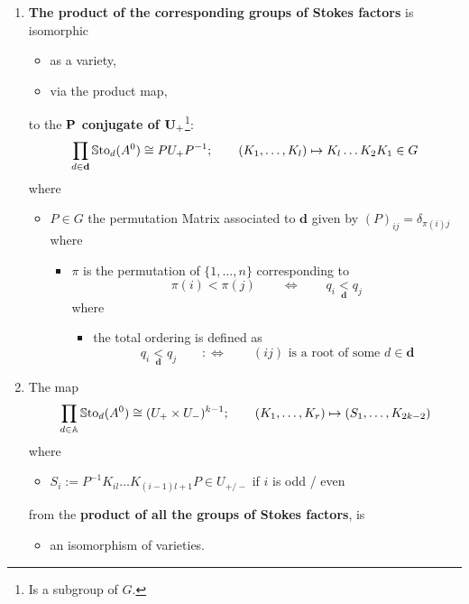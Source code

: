 \begin{lem}[3.2]
  \begin{enumerate}
    \item \textbf{The product of the corresponding groups of Stokes factors} is
      isomorphic
      \begin{itemize}
        \item as a variety,
        \item via the product map,
      \end{itemize}
      to the \textbf{$\bf P$ conjugate of $\bf U_+$}\footnote{Is a subgroup of
      $G$.}:
      \[
        \prod_{d\in\textbf{d}}\operatorname{\mathbb{S}to}_d(A^0)\cong PU_+P^{-1} ;
        \qquad
        (K_1,\dots,K_l)\mapsto K_l\dots K_2K_1\in G
      \]
      where
      \begin{itemize}
        \item $P\in G$ the permutation Matrix associated to $\textbf{d}$ given
          by $(P)_{ij}=\delta_{\pi(i)j}$ where
          \begin{itemize}
            \item $\pi$ is the permutation of $\{1,\dots,n\}$ corresponding to
            \[
              \pi(i)<\pi(j)
              \qquad \Leftrightarrow \qquad
              q_i\underset{\textbf{d}}{<}q_j
            \]
            where
            \begin{itemize}
              \item the total ordering is defined as
                \[
                  q_i\underset{\textbf{d}}{<}q_j \qquad :\Leftrightarrow
                    \qquad (ij) \text{ is a root of some } d\in\textbf{d}
                \]
            \end{itemize}
          \end{itemize}
      \end{itemize}
    \item The map
      \[
        \prod_{d\in\mathbb{A}}\operatorname{\mathbb{S}to}_d(A^0)\cong (U_+\times U_-)^{k-1} ;
        \qquad
        (K_1,\dots,K_r)\mapsto (S_1,\dots,K_{2k-2})
      \]
      where
      \begin{itemize}
        \item $S_i:=P^{-1}K_{il}\dots K_{(i-1)l+1}P\in U_{+/-}$ if $i$ is
        odd / even
      \end{itemize}
      from the \textbf{product of all the groups of
      Stokes factors}, is
      \begin{itemize}
        \item an isomorphism of varieties.
      \end{itemize}
  \end{enumerate}
\end{lem}

